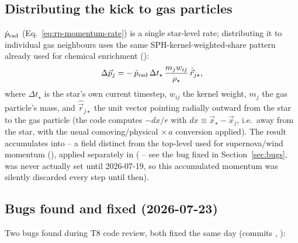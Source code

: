 \subsection{Distributing the kick to gas particles}
\label{sec:rp-distribute}

$\dot p_{\rm rad}$ (Eq.~\ref{eq:rp-momentum-rate}) is a single
star-level rate; distributing it to individual gas neighbours uses the
same SPH-kernel-weighted-share pattern already used for chemical
enrichment ():
\begin{equation}
  \Delta\vec p_j = -\,\dot p_{\rm rad}\,\Delta t_\star\,
  \frac{m_j w_{ij}}{\rho_\star}\,\hat{\vec r}_{j\star},
  \label{eq:rp-per-particle}
\end{equation}
where $\Delta t_\star$ is the star's own current timestep, $w_{ij}$ the
kernel weight, $m_j$ the gas particle's mass, and $\hat{\vec r}_{j\star}$
the unit vector pointing radially outward from the star to the gas
particle (the code computes $-dx/r$ with $dx \equiv \vec x_\star -
\vec x_j$, i.e.\ away from the star, with the usual comoving/physical
$\times\,a$ conversion applied). The result accumulates into
 -- a field distinct from
the top-level  used for
supernova/wind momentum (), applied separately
in 
( -- see the bug fixed in
Section~\ref{sec:bugs},  was never actually
set until 2026-07-19, so this accumulated momentum was silently
discarded every step until then).

\subsection{Bugs found and fixed (2026-07-23)}
\label{sec:rp-bugs-20260723}

Two bugs found during T8 code review, both fixed the same day (commits
, ):

